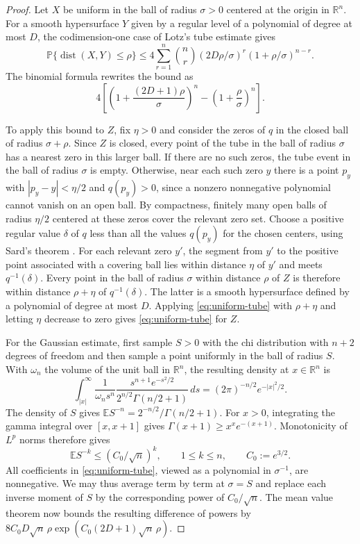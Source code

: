 \begin{proof}
Let \(X\) be uniform in the ball of radius \(\sigma>0\) centered at the origin in \(\mathbb R^n\).
For a smooth hypersurface \(Y\) given by a regular level of a polynomial of degree at most \(D\), the codimension-one case of Lotz's tube estimate \cite[Theorem~1.1]{Lot15} gives
\[
  \mathbb P\bigl\{\operatorname{dist}(X,Y)\le\rho\bigr\}
  \le 4\sum_{r=1}^n \binom nr
       (2D\rho/\sigma)^r(1+\rho/\sigma)^{n-r}.
\]
The binomial formula rewrites the bound as
\begin{equation}
  4\left[\left(1+\frac{(2D+1)\rho}{\sigma}\right)^n
         -\left(1+\frac{\rho}{\sigma}\right)^n\right].
  \label{eq:uniform-tube}
\end{equation}

To apply this bound to \(Z\), fix \(\eta>0\) and consider the zeros of \(q\) in the closed ball of radius \(\sigma+\rho\).
Since \(Z\) is closed, every point of the tube in the ball of radius \(\sigma\) has a nearest zero in this larger ball.
If there are no such zeros, the tube event in the ball of radius \(\sigma\) is empty.
Otherwise, near each such zero \(y\) there is a point \(p_y\) with \(|p_y-y|<\eta/2\) and \(q(p_y)>0\), since a nonzero nonnegative polynomial cannot vanish on an open ball.
By compactness, finitely many open balls of radius \(\eta/2\) centered at these zeros cover the relevant zero set.
Choose a positive regular value \(\delta\) of \(q\) less than all the values \(q(p_y)\) for the chosen centers, using Sard's theorem \cite[Theorems~4.1 and~7.2]{Sar42}.
For each relevant zero \(y'\), the segment from \(y'\) to the positive point associated with a covering ball lies within distance \(\eta\) of \(y'\) and meets \(q^{-1}(\delta)\).
Every point in the ball of radius \(\sigma\) within distance \(\rho\) of \(Z\) is therefore within distance \(\rho+\eta\) of \(q^{-1}(\delta)\).
The latter is a smooth hypersurface defined by a polynomial of degree at most \(D\).
Applying \eqref{eq:uniform-tube} with \(\rho+\eta\) and letting \(\eta\) decrease to zero gives \eqref{eq:uniform-tube} for \(Z\).

For the Gaussian estimate, first sample \(S>0\) with the chi distribution with \(n+2\) degrees of freedom and then sample a point uniformly in the ball of radius \(S\).
With \(\omega_n\) the volume of the unit ball in \(\mathbb R^n\), the resulting density at \(x\in\mathbb R^n\) is
\[
  \int_{|x|}^\infty
    \frac{1}{\omega_n s^n}
    \frac{s^{n+1}e^{-s^2/2}}{2^{n/2}\Gamma(n/2+1)}\,ds
  = (2\pi)^{-n/2}e^{-|x|^2/2}.
\]
The density of \(S\) gives \(\mathbb E S^{-n}=2^{-n/2}/\Gamma(n/2+1)\).
For \(x>0\), integrating the gamma integral over \([x,x+1]\) gives \(\Gamma(x+1)\ge x^x e^{-(x+1)}\).
Monotonicity of \(L^p\) norms therefore gives
\[
 \mathbb E S^{-k}\le (C_0/\sqrt n)^k,\qquad
 1\le k\le n,\qquad C_0:=e^{3/2}.
\]
All coefficients in \eqref{eq:uniform-tube}, viewed as a polynomial in \(\sigma^{-1}\), are nonnegative.
We may thus average term by term at \(\sigma=S\) and replace each inverse moment of \(S\) by the corresponding power of \(C_0/\sqrt n\).
The mean value theorem now bounds the resulting difference of powers by \(8C_0D\sqrt n\,\rho\exp(C_0(2D+1)\sqrt n\,\rho)\).
\end{proof}

